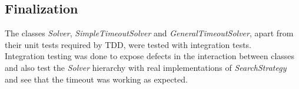 \subsection{Finalization}
The classes \emph{Solver}, \emph{SimpleTimeoutSolver} and \emph{GeneralTimeoutSolver}, apart from their unit tests required by TDD, were tested with integration tests.  \\
Integration testing was done to expose defects in the interaction between classes and also test the \emph{Solver} hierarchy with real implementations of \emph{SearchStrategy} and see that the timeout was working as expected. 
